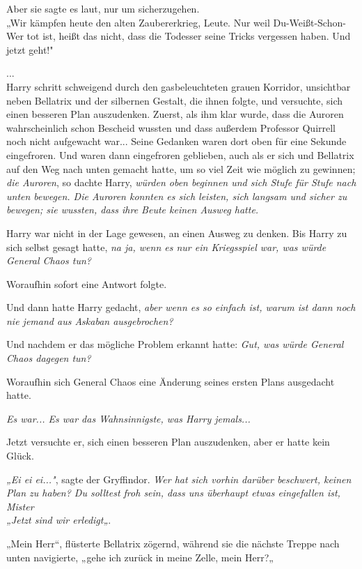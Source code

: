 {Aber sie sagte es laut, nur um sicherzugehen.\\ „Wir kämpfen heute den alten Zaubererkrieg, Leute. Nur weil Du-Weißt-Schon-Wer tot ist, heißt das nicht, dass die Todesser seine Tricks vergessen haben. Und jetzt geht!"

...\\ Harry schritt schweigend durch den gasbeleuchteten grauen Korridor, unsichtbar neben Bellatrix und der silbernen Gestalt, die ihnen folgte, und versuchte, sich einen besseren Plan auszudenken. Zuerst, als ihm klar wurde, dass die Auroren wahrscheinlich schon Bescheid wussten und dass außerdem Professor Quirrell noch nicht aufgewacht war... Seine Gedanken waren dort oben für eine Sekunde eingefroren. Und waren dann eingefroren geblieben, auch als er sich und Bellatrix auf den Weg nach unten gemacht hatte, um so viel Zeit wie möglich zu gewinnen; \emph{die Auroren}, so dachte Harry, \emph{würden oben beginnen und sich Stufe für Stufe nach unten bewegen. Die Auroren konnten es sich leisten, sich langsam und sicher zu bewegen; sie wussten, dass ihre Beute keinen Ausweg hatte.}

Harry war nicht in der Lage gewesen, an einen Ausweg zu denken. Bis Harry zu sich selbst gesagt hatte, \emph{na ja, wenn es nur ein Kriegsspiel war, was würde General Chaos tun?}

Woraufhin sofort eine Antwort folgte.

Und dann hatte Harry gedacht, \emph{aber wenn es so einfach ist, warum ist dann noch nie jemand aus Askaban ausgebrochen?}

Und nachdem er das mögliche Problem erkannt hatte: \emph{Gut, was würde General Chaos dagegen tun?}

Woraufhin sich General Chaos eine Änderung seines ersten Plans ausgedacht hatte.

\emph{Es war... Es war das Wahnsinnigste, was Harry jemals...}

Jetzt versuchte er, sich einen besseren Plan auszudenken, aber er hatte kein Glück.

\emph{„Ei ei ei..."}, sagte der Gryffindor. \emph{Wer hat sich vorhin darüber beschwert, keinen Plan zu haben? Du solltest froh sein, dass uns überhaupt etwas eingefallen ist, Mister\\ „Jetzt sind wir erledigt„}.

„Mein Herr“, flüsterte Bellatrix zögernd, während sie die nächste Treppe nach unten navigierte, „gehe ich zurück in meine Zelle, mein Herr?„

}
